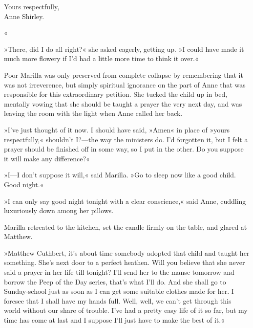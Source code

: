 \begin{flushright}
Yours respectfully,\\
Anne Shirley.\end{flushright}«

»There, did I do all right?« she asked eagerly, getting up. »I could have made it much more flowery if I’d had a little more time to think it over.«

Poor Marilla was only preserved from complete collapse by remembering that it was not irreverence, but simply spiritual ignorance on the part of Anne that was responsible for this extraordinary petition. She tucked the child up in bed, mentally vowing that she should be taught a prayer the very next day, and was leaving the room with the light when Anne called her back.

»I’ve just thought of it now. I should have said, »Amen« in place of »yours respectfully,« shouldn’t I?—the way the ministers do. I’d forgotten it, but I felt a prayer should be finished off in some way, so I put in the other. Do you suppose it will make any difference?«

»I—I don’t suppose it will,« said Marilla. »Go to sleep now like a good child. Good night.«

»I can only say good night tonight with a clear conscience,« said Anne, cuddling luxuriously down among her pillows.

Marilla retreated to the kitchen, set the candle firmly on the table, and glared at Matthew.

»Matthew Cuthbert, it’s about time somebody adopted that child and taught her something. She’s next door to a perfect heathen. Will you believe that she never said a prayer in her life till tonight? I’ll send her to the manse tomorrow and borrow the Peep of the Day series, that’s what I’ll do. And she shall go to Sunday-school just as soon as I can get some suitable clothes made for her. I foresee that I shall have my hands full. Well, well, we can’t get through this world without our share of trouble. I’ve had a pretty easy life of it so far, but my time has come at last and I suppose I’ll just have to make the best of it.«